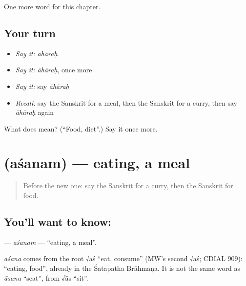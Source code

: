 \begin{grammarlens}[title={What you've built}]
One more word for this chapter.
\end{grammarlens}

\subsection*{Your turn}
\begin{itemize}
\raggedright
  \item \emph{Say it:} \emph{āhāraḥ}
  \item \emph{Say it:} \emph{āhāraḥ}, once more
  \item \emph{Say it:} say \emph{āhāraḥ}
  \item \emph{Recall:} say the Sanskrit for a meal, then the Sanskrit for a curry, then say \emph{āhāraḥ} again
\end{itemize}

\begin{tcolorbox}[breakable,colback=teal!4,colframe=teal!35!black,title={Before you move on}]
What does  mean? (\textquotedblleft{}Food, diet\textquotedblright{}.) Say it once more.
\end{tcolorbox}
\section[\texorpdfstring{\sk{अशनम्} (aśanam)}{अशनम् (aśanam)}]{ (aśanam) — eating, a meal}

\label{lesson:SA-C160-asanam}



\begin{quote}
Before the new one: say the Sanskrit for a curry, then the Sanskrit for food.
\end{quote}

\subsection*{You'll want to know: }
\textbf{} — \emph{aśanam} — \textquotedblleft{}eating, a meal\textquotedblright{}.

\begin{cousinweb}
\emph{aśana} comes from the root √aś \textquotedblleft{}eat, consume\textquotedblright{} (MW's second √aś; CDIAL 909): \textquotedblleft{}eating, food\textquotedblright{}, already in the Śatapatha Brāhmaṇa. It is not the same word as \emph{āsana} \textquotedblleft{}seat\textquotedblright{}, from √ās \textquotedblleft{}sit\textquotedblright{}.
\end{cousinweb}

